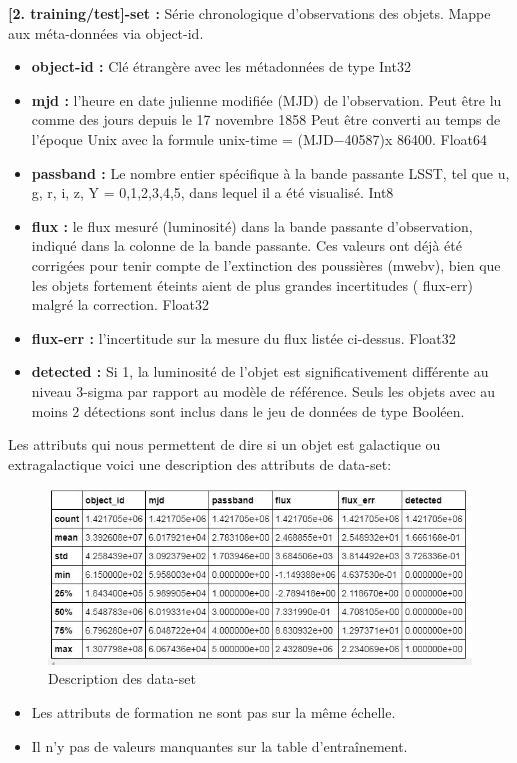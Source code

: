 \textbf{[2. training/test]-set :} Série chronologique d’observations des objets. Mappe aux méta-données via object-id.
\begin{itemize}
    \item \textbf{object-id :} Clé étrangère avec les métadonnées de type Int32
    \item \textbf{ mjd :} l’heure en date julienne modifiée (MJD) de l’observation. Peut être lu comme des jours depuis le 17 novembre 1858 Peut être converti au temps de l’époque Unix avec la formule unix-time = (MJD−40587)x 86400. Float64
    \item \textbf{passband :} Le nombre entier spécifique à la bande passante LSST, tel que u, g, r, i, z, Y = 0,1,2,3,4,5, dans lequel il a été visualisé. Int8
    \item \textbf{flux :} le flux mesuré (luminosité) dans la bande passante d’observation, indiqué dans la colonne de la bande passante. Ces valeurs ont déjà été corrigées pour tenir compte de l’extinction des poussières (mwebv), bien que les objets fortement éteints aient de plus grandes incertitudes ( flux-err) malgré la correction. Float32
    \item \textbf{flux-err :} l’incertitude sur la mesure du flux listée ci-dessus. Float32
    \item \textbf{ detected :} Si 1, la luminosité de l’objet est significativement différente au niveau 3-sigma par rapport au modèle de référence. Seuls les objets avec au moins 2 détections sont inclus dans le jeu de données de type Booléen.
\end{itemize}
Les attributs qui nous permettent de dire si un objet est galactique ou extragalactique
voici une description des attributs de data-set: 
\begin{figure}[!h]
    \centering
    \includegraphics[width=18cm]{report/figures/exploreData.jpg}
    \caption{Description des data-set}
    \label{fig:my_label}
\end{figure}
\begin{itemize}
    \item Les attributs de formation ne sont pas sur la même échelle.
    \item Il n'y pas de valeurs manquantes sur la table d'entraînement.
\end{itemize}



